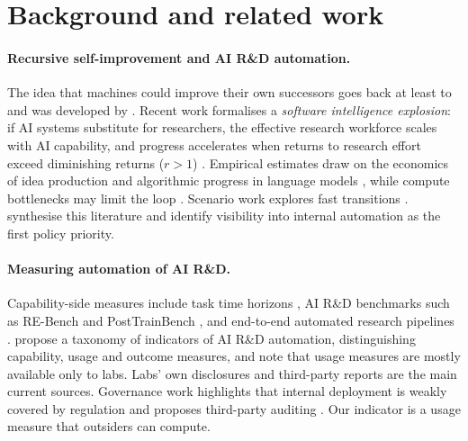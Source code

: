 \documentclass[11pt]{article}
\begin{document}
\section{Background and related work}
\label{sec:related}

\paragraph{Recursive self-improvement and AI R\&D automation.}
The idea that machines could improve their own successors goes back at least to \citet{good1966speculations} and was developed by \citet{bostrom2014superintelligence}. Recent work formalises a \emph{software intelligence explosion}: if AI systems substitute for researchers, the effective research workforce scales with AI capability, and progress accelerates when returns to research effort exceed diminishing returns ($r>1$) \citep{eth2025sie,ho2025sie,davidson2026feedback,cunningham2026economics,ord2026dynamics}. Empirical estimates draw on the economics of idea production \citep{bloom2020ideas} and algorithmic progress in language models \citep{ho2024algorithmic}, while compute bottlenecks may limit the loop \citep{whitfill2025compute}. Scenario work explores fast transitions \citep{kokotajlo2025ai2027}. \citet{chan2026explosion} synthesise this literature and identify visibility into internal automation as the first policy priority.

\paragraph{Measuring automation of AI R\&D.}
Capability-side measures include task time horizons \citep{kwa2025horizon}, AI R\&D benchmarks such as RE-Bench \citep{wijk2025rebench} and PostTrainBench \citep{rank2026posttrainbench}, and end-to-end automated research pipelines \citep{lu2026endtoend}. \citet{chan2026measuring} propose a taxonomy of indicators of AI R\&D automation, distinguishing capability, usage and outcome measures, and note that usage measures are mostly available only to labs. Labs' own disclosures \citep{favaro2026builds,favaro2026measurements,openai2026acceleration} and third-party reports \citep{metr2026frontier} are the main current sources. Governance work highlights that internal deployment is weakly covered by regulation \citep{kwon2026internal,stix2025closed} and proposes third-party auditing \citep{brundage2026auditing}. Our indicator is a usage measure that outsiders can compute.
\end{document}
